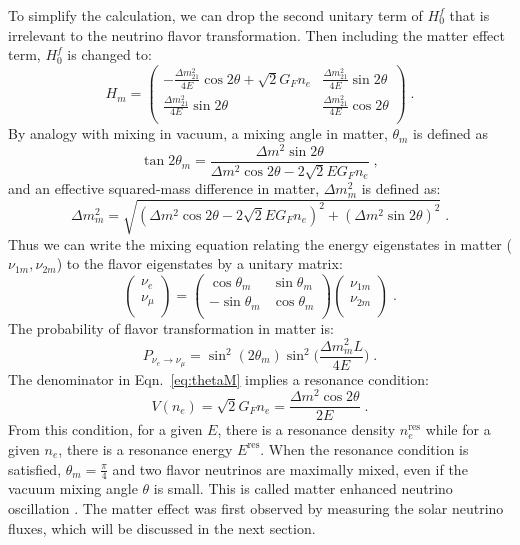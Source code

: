 To simplify the calculation, we can drop the second unitary term of $H^f_0$ that is irrelevant to the neutrino flavor transformation. Then including the matter effect term, $H^f_0$ is changed to: 
\begin{equation}\label{eq:Hm}
	H_m = \begin{pmatrix}
		-\frac{\Delta m_{21}^2}{4E}\cos 2\theta+\sqrt 2G_Fn_e & \frac{\Delta m_{21}^2}{4E}\sin 2\theta\\
		\frac{\Delta m_{21}^2}{4E}\sin 2\theta &\frac{\Delta m_{21}^2}{4E}\cos 2\theta\\
	\end{pmatrix} \; .
\end{equation}
By analogy with mixing in vacuum, a mixing angle in matter, $\theta_m$ is defined as
\begin{equation}\label{eq:thetaM}
	\tan 2\theta_m = \frac{\Delta m^2\sin2\theta}{\Delta m^2\cos2\theta-2\sqrt 2E G_Fn_e}\; ,
\end{equation}
and an effective squared-mass difference in matter, $\Delta m^2_m$ is defined as:
\begin{equation}
	\Delta m^2_m = \sqrt{(\Delta m^2\cos2\theta - 2\sqrt 2EG_Fn_e)^2+(\Delta m^2\sin2\theta)^2}\; .
\end{equation}
Thus we can write the mixing equation relating the energy eigenstates in matter ($\nu_{1m},\nu_{2m}$) to the flavor eigenstates by a unitary matrix:
\begin{equation}\label{eq:matter_mixing}
	\begin{pmatrix}
		\nu_e\\
		\nu_\mu\\
	\end{pmatrix}
	= \begin{pmatrix}
		\cos\theta_m & \sin\theta_m\\
		-\sin\theta_m & \cos\theta_m \\
	\end{pmatrix}
	\begin{pmatrix}
		\nu_{1m}\\
		\nu_{2m}\\
	\end{pmatrix}\; .
\end{equation}
The probability of flavor transformation in matter is:
\begin{equation}
	P_{\nu_e\to\nu_{\mu}}=\sin^2(2\theta_m)\sin^2\Big(\frac{\Delta m_m^2L}{4E}\Big)\; .
\end{equation}
The denominator in Eqn.~\ref{eq:thetaM} implies a resonance condition:
\begin{equation}\label{eq:reson_condition}
	V(n_e)=\sqrt 2G_Fn_e=\frac{\Delta m^2\cos2\theta}{2E}\; .
\end{equation}
From this condition, for a given $E$, there is a resonance density $n^{\mathrm{res}}_e$ while for a given $n_e$, there is a resonance energy $E^{\mathrm{res}}$. When the resonance condition is satisfied, $\theta_m = \frac{\pi}{4}$ and two flavor neutrinos are maximally mixed, even if the vacuum mixing angle $\theta$ is small. This is called matter enhanced neutrino oscillation \cite{smirnov2016solar,fukugita2013physics}. The matter effect was first observed by measuring the solar neutrino fluxes, which will be discussed in the next section.

